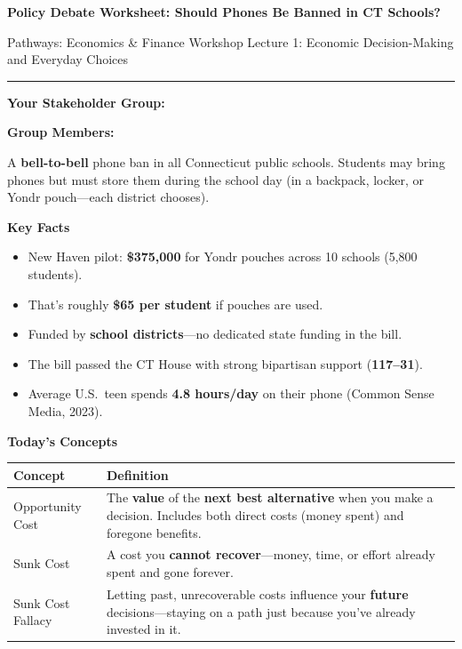 \documentclass[letterpaper,10pt]{article}
\begin{document}
\begin{center}
  {\Large\textbf{Policy Debate Worksheet: Should Phones Be Banned in CT Schools?}}

  \vspace{0.3em}
  {\small Pathways: Economics \& Finance Workshop \hfill Lecture 1: Economic Decision-Making and Everyday Choices}
\end{center}

\vspace{0.3em}
\hrule
\vspace{0.5em}

\textbf{Your Stakeholder Group:} \hrulefill

\vspace{0.3em}
\textbf{Group Members:} \hrulefill

\vspace{0.8em}

\begin{definitionbox}
  A \textbf{bell-to-bell} phone ban in all Connecticut public schools.
  Students may bring phones but must store them during the school day (in a backpack, locker, or Yondr pouch---each district chooses).
\end{definitionbox}

\vspace{0.5em}

\textbf{Key Facts}
\begin{itemize}
  \item New Haven pilot: \textbf{\$375,000} for Yondr pouches across 10 schools (5,800 students).
  \item That's roughly \textbf{\$65 per student} if pouches are used.
  \item Funded by \textbf{school districts}---no dedicated state funding in the bill.
  \item The bill passed the CT House with strong bipartisan support (\textbf{117--31}).
  \item Average U.S.\ teen spends \textbf{4.8 hours/day} on their phone (Common Sense Media, 2023).
\end{itemize}

\vspace{0.3em}

\textbf{Today's Concepts}

\vspace{0.2em}
{\small
\begin{tabular}{@{} l p{11cm} @{}}
  \toprule
  \textbf{Concept} & \textbf{Definition} \\
  \midrule
  Opportunity Cost & The \textbf{value} of the \textbf{next best alternative} when you make a decision. Includes both direct costs (money spent) and foregone benefits. \\[0.3em]
  Sunk Cost & A cost you \textbf{cannot recover}---money, time, or effort already spent and gone forever. \\[0.3em]
  Sunk Cost Fallacy & Letting past, unrecoverable costs influence your \textbf{future} decisions---staying on a path just because you've already invested in it. \\
  \bottomrule
\end{tabular}
}
\end{document}
